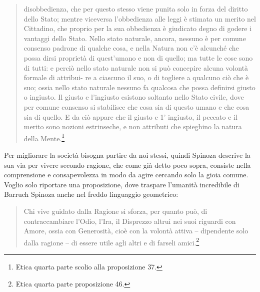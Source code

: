 \begin{quotation}
	disobbedienza, che per questo stesso viene punita solo in forza del diritto dello Stato; mentre viceversa l’obbedienza alle leggi è stimata un merito nel Cittadino, che proprio per la
	sua obbedienza è giudicato degno di godere i vantaggi dello Stato. Nello stato naturale, ancora, nessuno è per comune consenso padrone di qualche cosa, e nella Natura non c’è alcunché che possa dirsi proprietà di quest’umano e non di quello; ma tutte le cose sono di
	tutti: e perciò nello stato naturale non si può concepire alcuna volontà formale di attribui-
	re a ciascuno il suo, o di togliere a qualcuno ciò che è suo; ossia nello stato naturale nessuno fa qualcosa che possa definirsi giusto o ingiusto. Il giusto e l’ingiusto esistono soltanto
	nello Stato civile, dove per comune consenso si stabilisce che cosa sia di questo umano e
	che cosa sia di quello. E da ciò appare che il giusto e 1’ ingiusto, il peccato e il merito sono
	nozioni estrinseche, e non attributi che spieghino la natura della Mente.\footnote{Etica quarta parte scolio alla proposizione 37.}
\end{quotation}

Per migliorare la società bisogna partire da noi stessi, quindi Spinoza descrive la sua via per vivere secondo ragione, che come già detto poco sopra, consiste nella comprensione e consapevolezza in modo da agire cercando solo la gioia comune. Voglio solo riportare una proposizione, dove traspare l'umanità incredibile di Barruch Spinoza anche nel freddo linguaggio geometrico:

\begin{quotation}
	\small Chi vive guidato dalla Ragione si sforza, per quanto può, di contraccambiare l’Odio, l’Ira,
	il Disprezzo altrui nei suoi riguardi con Amore, ossia con Generosità, cioè con la volontà attiva – dipendente solo dalla ragione – di essere utile agli altri e di farseli amici.\footnote{Etica quarta parte proposizione 46.}
\end{quotation}



